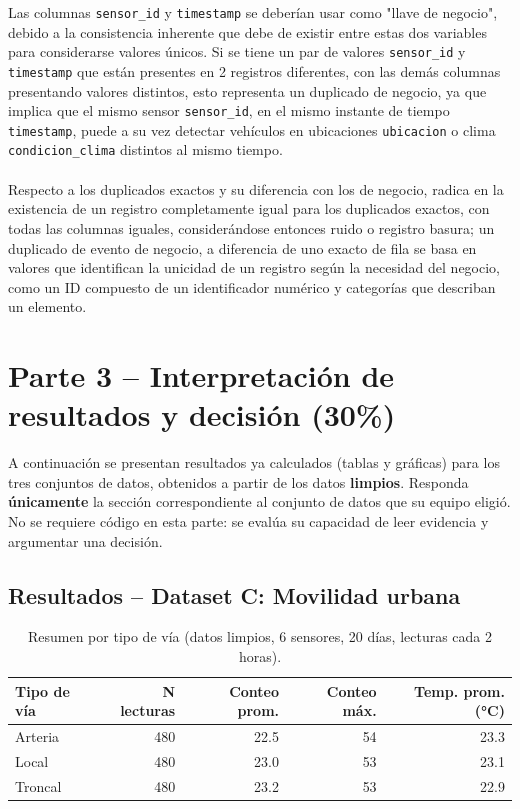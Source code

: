 \documentclass[11pt]{article}
\begin{document}
Las columnas \verb|sensor_id| y \verb|timestamp| se deberían usar como "llave de negocio", debido a la consistencia inherente que debe de existir entre estas dos variables para considerarse valores únicos. Si se tiene un par de valores \verb|sensor_id| y \verb|timestamp| que están presentes en 2 registros diferentes, con las demás columnas presentando valores distintos, esto representa un duplicado de negocio, ya que implica que el mismo sensor \verb|sensor_id|, en el mismo instante de tiempo \verb|timestamp|, puede a su vez detectar vehículos en ubicaciones \verb|ubicacion| o clima \verb|condicion_clima| distintos al mismo tiempo.\\\\
Respecto a los duplicados exactos y su diferencia con los de negocio, radica en la existencia de un registro completamente igual para los duplicados exactos, con todas las columnas iguales, considerándose entonces ruido o registro basura; un duplicado de evento de negocio, a diferencia de uno exacto de fila se basa en valores que identifican la unicidad de un registro según la necesidad del negocio, como un ID compuesto de un identificador numérico y categorías que describan un elemento.

\section{Parte 3 -- Interpretación de resultados y decisión (30\%)}
\begin{contexto}
A continuación se presentan resultados ya calculados (tablas y gráficas) para los tres conjuntos de datos, obtenidos a partir de los datos \textbf{limpios}. Responda \textbf{únicamente} la sección correspondiente al conjunto de datos que su equipo eligió. No se requiere código en esta parte: se evalúa su capacidad de leer evidencia y argumentar una decisión.
\end{contexto}

\subsection*{Resultados -- Dataset C: Movilidad urbana}
\begin{table}[h!]
\centering
\small
\begin{tabular}{lrrrr}
\toprule
Tipo de vía & N lecturas & Conteo prom. & Conteo máx. & Temp. prom. (°C) \\
\midrule
Arteria & 480 & 22.5 & 54 & 23.3 \\
Local   & 480 & 23.0 & 53 & 23.1 \\
Troncal & 480 & 23.2 & 53 & 22.9 \\
\bottomrule
\end{tabular}
\caption{Resumen por tipo de vía (datos limpios, 6 sensores, 20 días, lecturas cada 2 horas).}
\end{table}
\end{document}
